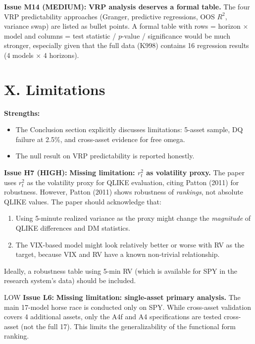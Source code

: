 \documentclass[12pt,a4paper]{article}
\begin{document}
\textcolor{warncolor}{\textbf{Issue M14 (MEDIUM):}} \textbf{VRP analysis deserves a formal table.} The four VRP predictability approaches (Granger, predictive regressions, OOS $R^2$, variance swap) are listed as bullet points. A formal table with rows = horizon $\times$ model and columns = test statistic / $p$-value / significance would be much stronger, especially given that the full data (K998) contains 16 regression results (4 models $\times$ 4 horizons).


\section*{X. Limitations}

\textcolor{okgreen}{\textbf{Strengths:}}
\begin{itemize}
\item The Conclusion section explicitly discusses limitations: 5-asset sample, DQ failure at 2.5\%, and cross-asset evidence for free omega.
\item The null result on VRP predictability is reported honestly.
\end{itemize}

\textcolor{errorred}{\textbf{Issue H7 (HIGH):}} \textbf{Missing limitation: $r_t^2$ as volatility proxy.} The paper uses $r_t^2$ as the volatility proxy for QLIKE evaluation, citing Patton (2011) for robustness. However, Patton (2011) shows robustness of \emph{rankings}, not absolute QLIKE values. The paper should acknowledge that:
\begin{enumerate}
\item Using 5-minute realized variance as the proxy might change the \emph{magnitude} of QLIKE differences and DM statistics.
\item The VIX-based model might look relatively better or worse with RV as the target, because VIX and RV have a known non-trivial relationship.
\end{enumerate}
Ideally, a robustness table using 5-min RV (which is available for SPY in the research system's data) should be included.

\bigskip

LOW \textbf{Issue L6:} \textbf{Missing limitation: single-asset primary analysis.} The main 17-model horse race is conducted only on SPY. While cross-asset validation covers 4 additional assets, only the A4f and A4 specifications are tested cross-asset (not the full 17). This limits the generalizability of the functional form ranking.
\end{document}

